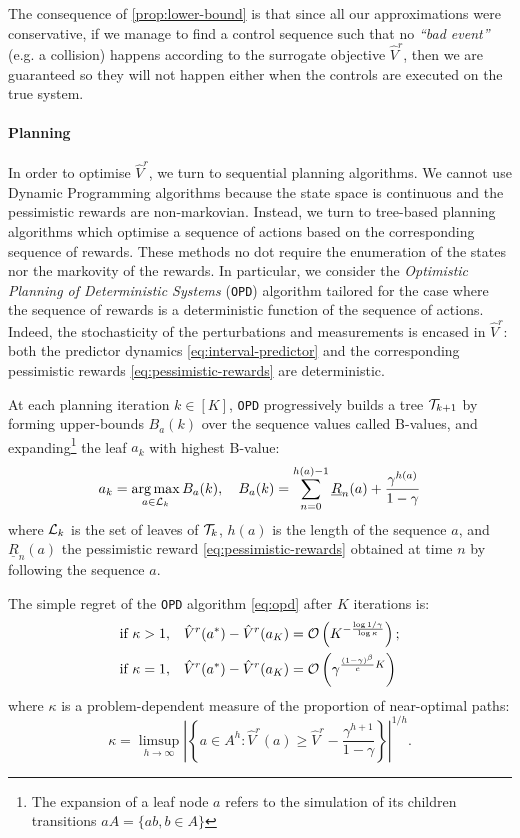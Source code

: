 \documentclass{article}
\begin{document}
The consequence of \autoref{prop:lower-bound} is that since all our approximations were conservative, if we manage to find a control sequence such that no \textit{``bad event''} (e.g. a collision) happens according to the surrogate objective $\hat{V}^r$, then we are guaranteed so they will not happen either when the controls are executed on the true system. 

\paragraph{Planning}
In order to optimise $\hat{V}^r$, we turn to sequential planning algorithms. We cannot use Dynamic Programming algorithms because the state space is continuous and the pessimistic rewards are non-markovian. Instead, we turn to tree-based planning algorithms which optimise a sequence of actions based on the corresponding sequence of rewards. These methods no dot require the enumeration of the states nor the markovity of the rewards. In particular, we consider the \emph{Optimistic Planning of Deterministic Systems} (\texttt{OPD}) algorithm \citep{Hren2008} tailored for the case where the sequence of rewards is a deterministic function of the sequence of actions. Indeed, the stochasticity of the perturbations and measurements is encased in $\hat{V}^r$: both the predictor dynamics \eqref{eq:interval-predictor} and the corresponding pessimistic rewards \eqref{eq:pessimistic-rewards} are deterministic.

At each planning iteration $k\in[K]$, \texttt{OPD} progressively builds a tree $\mathcal{T}_{k+1}$ by forming upper-bounds $B_a(k)$ over the sequence values called B-values, and expanding\footnote{The expansion of a leaf node $a$ refers to the simulation of its children transitions $aA = \{ab, b\in A\}$} the leaf $a_k$ with highest B-value:
\begin{equation}
\label{eq:opd}
a_k = \operatorname*{arg\,max}_{a\in\mathcal{L}_k} B_a(k), \quad B_a(k) = \sum_{n=0}^{h(a)-1} \underline{R}_n(a) + \frac{\gamma^{h(a)}}{1-\gamma}
\end{equation}
where $\mathcal{L}_k$ is the set of leaves of $\mathcal{T}_k$, $h(a)$ is the length of the sequence $a$, and $\underline{R}_n(a)$ the pessimistic reward \eqref{eq:pessimistic-rewards} obtained at time $n$ by following the sequence $a$.
\begin{theorem}
\label{theorem:opd-regret}
The simple regret of the \texttt{OPD} algorithm \eqref{eq:opd} after $K$ iterations is:
\begin{align*}
\text{if } \kappa>1,\quad& 
\hat{V}^r(a^*) - \hat{V}^r({a_K}) = \mathcal{O}\left(K^{-\frac{\log 1/\gamma}{\log \kappa}}\right);\\
\text{if }\kappa=1,\quad&
\hat{V}^r(a^*) - \hat{V}^r({a_K}) = \mathcal{O}\left(\gamma^{\frac{(1-\gamma)^\beta}{c}K}\right)
\end{align*}
where $\kappa$ is a problem-dependent measure of the proportion of near-optimal paths:
\[
\kappa = \limsup_{h\rightarrow\infty} \left|\left\{a\in A^h: \hat{V}^r(a)\geq \hat{V}^r - \frac{\gamma^{h+1}}{1-\gamma}\right\}\right|^{1/h}.
\]
\end{theorem}
\end{document}
